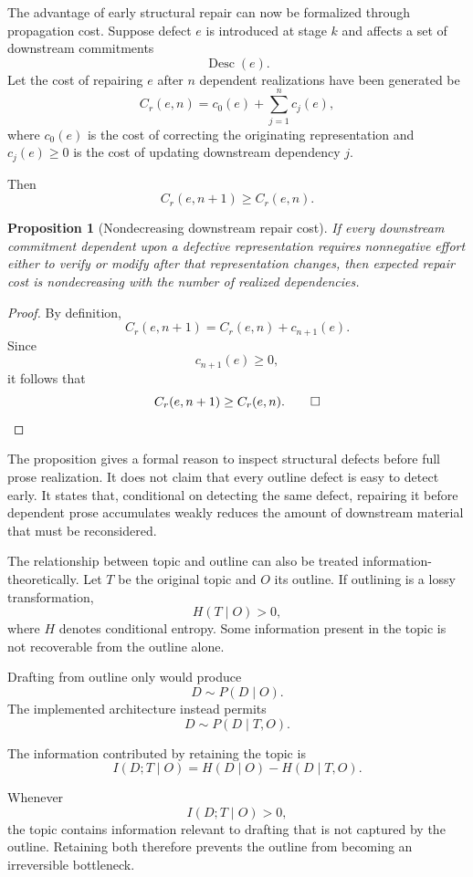 \documentclass[11pt]{article}
\newtheorem{proposition}[definition]{Proposition}
\begin{document}
The advantage of early structural repair can now be formalized through propagation cost. Suppose defect \(e\) is introduced at stage \(k\) and affects a set of downstream commitments
\[
    \operatorname{Desc}(e).
\]
Let the cost of repairing \(e\) after \(n\) dependent realizations have been generated be
\[
    C_r(e,n)
    =
    c_0(e)
    +
    \sum_{j=1}^{n}c_j(e),
\]
where \(c_0(e)\) is the cost of correcting the originating representation and \(c_j(e)\geq0\) is the cost of updating downstream dependency \(j\).

Then
\[
    C_r(e,n+1)\geq C_r(e,n).
\]

\begin{proposition}[Nondecreasing downstream repair cost]
If every downstream commitment dependent upon a defective representation requires nonnegative effort either to verify or modify after that representation changes, then expected repair cost is nondecreasing with the number of realized dependencies.
\end{proposition}

\begin{proof}
By definition,
\[
    C_r(e,n+1)
    =
    C_r(e,n)+c_{n+1}(e).
\]
Since
\[
    c_{n+1}(e)\geq0,
\]
it follows that
\[
    C_r(e,n+1)\geq C_r(e,n).
    \qed
\]
\end{proof}

The proposition gives a formal reason to inspect structural defects before full prose realization. It does not claim that every outline defect is easy to detect early. It states that, conditional on detecting the same defect, repairing it before dependent prose accumulates weakly reduces the amount of downstream material that must be reconsidered.

The relationship between topic and outline can also be treated information-theoretically. Let \(T\) be the original topic and \(O\) its outline. If outlining is a lossy transformation,
\[
    H(T\mid O)>0,
\]
where \(H\) denotes conditional entropy. Some information present in the topic is not recoverable from the outline alone.

Drafting from outline only would produce
\[
    D\sim P(D\mid O).
\]
The implemented architecture instead permits
\[
    D\sim P(D\mid T,O).
\]

The information contributed by retaining the topic is
\[
    I(D;T\mid O)
    =
    H(D\mid O)-H(D\mid T,O).
\]

Whenever
\[
    I(D;T\mid O)>0,
\]
the topic contains information relevant to drafting that is not captured by the outline. Retaining both therefore prevents the outline from becoming an irreversible bottleneck.
\end{document}
